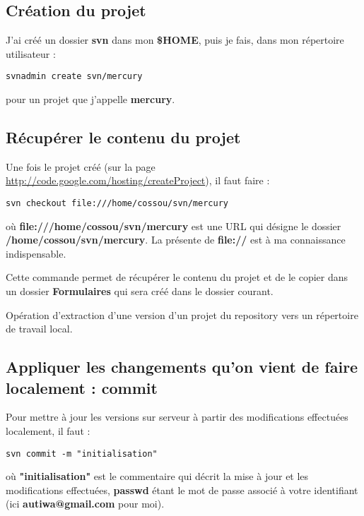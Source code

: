 \documentclass[a4paper,twoside]{article}
\begin{document}
\subsection{Création du projet}
J'ai créé un dossier \textbf{svn} dans mon \textbf{\$HOME}, puis je fais, dans mon répertoire utilisateur : 
\begin{verbatim}
svnadmin create svn/mercury
\end{verbatim}
pour un projet que j'appelle \textbf{mercury}.

\subsection{Récupérer le contenu du projet}
Une fois le projet créé (sur la page \url{http://code.google.com/hosting/createProject}), il faut faire : 
\begin{verbatim}
svn checkout file:///home/cossou/svn/mercury
\end{verbatim}
où \textbf{file:///home/cossou/svn/mercury} est une URL qui désigne le dossier \textbf{/home/cossou/svn/mercury}. La présente de \textbf{file://} est à ma connaissance indispensable.

Cette commande permet de récupérer le contenu du projet et de le copier dans un dossier \textbf{Formulaires} qui sera créé dans le dossier courant.

\begin{definition}[Checkout]
Opération d'extraction d'une version d'un projet du repository vers un répertoire de travail local.
\end{definition}


\subsection{Appliquer les changements qu'on vient de faire localement : commit}

Pour mettre à jour les versions sur serveur à partir des modifications effectuées localement, il faut : 
\begin{verbatim}
svn commit -m "initialisation"
\end{verbatim}
où \textbf{"initialisation"} est le commentaire qui décrit la mise à jour et les modifications effectuées, \textbf{passwd} étant le mot de passe associé à votre identifiant (ici \textbf{autiwa@gmail.com} pour moi).
\end{document}
